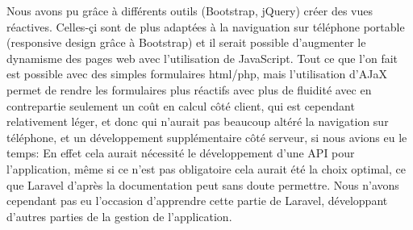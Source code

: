 \documentclass[12pt]{article}
\begin{document}
Nous avons pu grâce à différents outils (Bootstrap, jQuery) créer des vues réactives. Celles-çi sont de plus adaptées à la naviguation sur téléphone portable (responsive design grâce à Bootstrap) et il serait possible d'augmenter le dynamisme des pages web avec l'utilisation de JavaScript. Tout ce que l'on fait est possible avec des simples formulaires html/php, mais l'utilisation d'AJaX permet de rendre les formulaires plus réactifs avec plus de fluidité avec en contrepartie seulement un coût en calcul côté client, qui est cependant relativement léger, et donc qui n'aurait pas beaucoup altéré la navigation sur téléphone, et un développement supplémentaire côté serveur, si nous avions eu le temps: En effet cela aurait nécessité le développement d'une API pour l'application, même si ce n'est pas obligatoire cela aurait été la choix optimal, ce que Laravel d'après la documentation peut sans doute permettre. Nous n'avons cependant pas eu l'occasion d'apprendre cette partie de Laravel, développant d'autres parties de la gestion de l'application.
\end{document}
